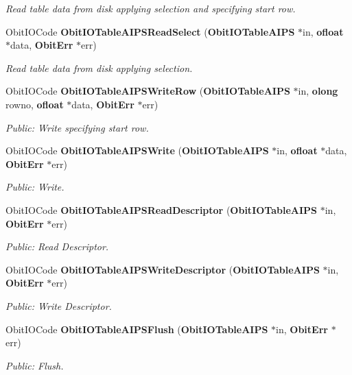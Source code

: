 \begin{CompactItemize}
\begin{CompactList}\small\item\em Read table data from disk applying selection and specifying start row. \item\end{CompactList}\item 
Obit\-IOCode {\bf Obit\-IOTable\-AIPSRead\-Select} ({\bf Obit\-IOTable\-AIPS} $\ast$in, {\bf ofloat} $\ast$data, {\bf Obit\-Err} $\ast$err)
\begin{CompactList}\small\item\em Read table data from disk applying selection. \item\end{CompactList}\item 
Obit\-IOCode {\bf Obit\-IOTable\-AIPSWrite\-Row} ({\bf Obit\-IOTable\-AIPS} $\ast$in, {\bf olong} rowno, {\bf ofloat} $\ast$data, {\bf Obit\-Err} $\ast$err)
\begin{CompactList}\small\item\em Public: Write specifying start row. \item\end{CompactList}\item 
Obit\-IOCode {\bf Obit\-IOTable\-AIPSWrite} ({\bf Obit\-IOTable\-AIPS} $\ast$in, {\bf ofloat} $\ast$data, {\bf Obit\-Err} $\ast$err)
\begin{CompactList}\small\item\em Public: Write. \item\end{CompactList}\item 
Obit\-IOCode {\bf Obit\-IOTable\-AIPSRead\-Descriptor} ({\bf Obit\-IOTable\-AIPS} $\ast$in, {\bf Obit\-Err} $\ast$err)
\begin{CompactList}\small\item\em Public: Read Descriptor. \item\end{CompactList}\item 
Obit\-IOCode {\bf Obit\-IOTable\-AIPSWrite\-Descriptor} ({\bf Obit\-IOTable\-AIPS} $\ast$in, {\bf Obit\-Err} $\ast$err)
\begin{CompactList}\small\item\em Public: Write Descriptor. \item\end{CompactList}\item 
Obit\-IOCode {\bf Obit\-IOTable\-AIPSFlush} ({\bf Obit\-IOTable\-AIPS} $\ast$in, {\bf Obit\-Err} $\ast$err)
\begin{CompactList}\small\item\em Public: Flush. \item\end{CompactList}\item 

\end{CompactItemize}
